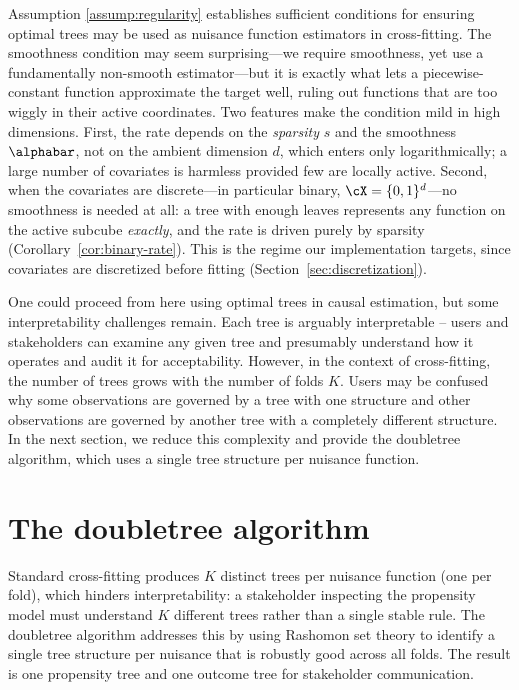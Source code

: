 \documentclass[12pt]{article}
\begin{document}
\begin{remark}
Assumption \ref{assump:regularity} establishes sufficient conditions for ensuring optimal trees may be used as nuisance function estimators in cross-fitting. The smoothness condition may seem surprising---we require smoothness, yet use a fundamentally non-smooth estimator---but it is exactly what lets a piecewise-constant function approximate the target well, ruling out functions that are too wiggly in their active coordinates. Two features make the condition mild in high dimensions. First, the rate depends on the \emph{sparsity} $s$ and the smoothness $\alphabar$, not on the ambient dimension $d$, which enters only logarithmically; a large number of covariates is harmless provided few are locally active. Second, when the covariates are discrete---in particular binary, $\cX = \{0,1\}^d$---no smoothness is needed at all: a tree with enough leaves represents any function on the active subcube \emph{exactly}, and the rate is driven purely by sparsity (Corollary~\ref{cor:binary-rate}). This is the regime our implementation targets, since covariates are discretized before fitting (Section~\ref{sec:discretization}).
\end{remark}

One could proceed from here using optimal trees in causal estimation, but some interpretability challenges remain. Each tree is arguably interpretable -- users and stakeholders can examine any given tree and presumably understand how it operates and audit it for acceptability. However, in the context of cross-fitting, the number of trees grows with the number of folds $K$. Users may be confused why some observations are governed by a tree with one structure and other observations are governed by another tree with a completely different structure. In the next section, we reduce this complexity and provide the doubletree algorithm, which uses a single tree structure per nuisance function.

\section{The doubletree algorithm}
\label{sec:rashomon}

Standard cross-fitting produces $K$ distinct trees per nuisance function (one per fold), which hinders interpretability: a stakeholder inspecting the propensity model must understand $K$ different trees rather than a single stable rule. The doubletree algorithm addresses this by using Rashomon set theory to identify a single tree structure per nuisance that is robustly good across all folds. The result is one propensity tree and one outcome tree for stakeholder communication.
\end{document}

